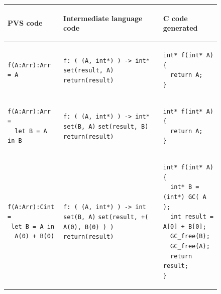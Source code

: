 \documentclass[12pt,a4paper,titlepage]{article}
\newcommand{\cl}[1]{\texttt{#1}}
\begin{document}
\begin{figure}[!ht]
\begin{tabular}{|p{5.2cm}|p{5.8cm}|p{6cm}|}
\hline
\begin{center}
PVS code
\end{center} &
\begin{center}
Intermediate language code
\end{center} &
\begin{center}
C code generated
\end{center} \\ \hline

\begin{lstlisting}
f(A:Arr):Arr = A
\end{lstlisting} &
\cl{f: ( (A, int*) ) -> int*} \newline
\cl{set(result, A)} \newline
\cl{return(result)} &
\begin{lstlisting}
int* f(int* A) {
  return A;
}
\end{lstlisting} \\ \hline

\begin{lstlisting}
f(A:Arr):Arr =
  let B = A in B
\end{lstlisting} &
\cl{f: ( (A, int*) ) -> int*} \newline
\cl{set(B, A)} \newline
\cl{set(result, B)} \newline
\cl{return(result)} &
\begin{lstlisting}
int* f(int* A) {
  return A;
}
\end{lstlisting} \\ \hline

\begin{lstlisting}
f(A:Arr):Cint =
 let B = A in
  A(0) + B(0)
\end{lstlisting} &
\cl{f: ( (A, int*) ) -> int} \newline
\cl{set(B, A)} \newline
\cl{set(result, +( A(0), B(0) ) )} \newline
\cl{return(result)} &
\begin{lstlisting}
int* f(int* A) {
  int* B = (int*) GC( A );
  int result = A[0] + B[0];
  GC_free(B);
  GC_free(A);
  return result;
}
\end{lstlisting} \\ \hline


\end{tabular}
\end{figure}
\end{document}
